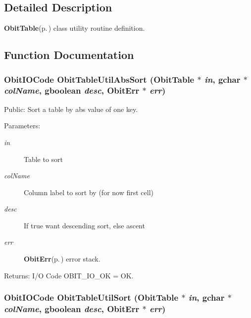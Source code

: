 \subsection{Detailed Description}
{\bf Obit\-Table}{\rm (p.\,\pageref{structObitTable})} class utility routine definition. 



\subsection{Function Documentation}
\subsubsection{\setlength{\rightskip}{0pt plus 5cm}Obit\-IOCode Obit\-Table\-Util\-Abs\-Sort ({\bf Obit\-Table} $\ast$ {\em in}, gchar $\ast$ {\em col\-Name}, gboolean {\em desc}, {\bf Obit\-Err} $\ast$ {\em err})}\label{ObitTableUtil_8h_a1}


Public: Sort a table by abs value of one key. 

\begin{Desc}
\item[Parameters:]
\begin{description}
\item[{\em in}]Table to sort \item[{\em col\-Name}]Column label to sort by (for now first cell) \item[{\em desc}]If true want descending sort, else ascent \item[{\em err}]{\bf Obit\-Err}{\rm (p.\,\pageref{structObitErr})} error stack. \end{description}
\end{Desc}
\begin{Desc}
\item[Returns:]I/O Code OBIT\_\-IO\_\-OK = OK. \end{Desc}
\subsubsection{\setlength{\rightskip}{0pt plus 5cm}Obit\-IOCode Obit\-Table\-Util\-Sort ({\bf Obit\-Table} $\ast$ {\em in}, gchar $\ast$ {\em col\-Name}, gboolean {\em desc}, {\bf Obit\-Err} $\ast$ {\em err})}\label{ObitTableUtil_8h_a0}


